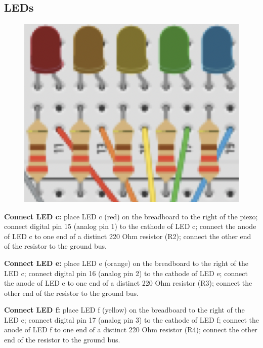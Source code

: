 \documentclass[a4paper]{article}
\begin{document}
\subsection{LEDs}

\begin{figure}
  \vspace{-35pt}
  \begin{center}
    \includegraphics[width=1.1\linewidth]{leds.png}
  \end{center}
\vspace{-25pt}
\end{figure}

\noindent \textbf{Connect LED c:} place LED c (red) on the breadboard to the right of the piezo; connect digital pin 15 (analog pin 1) to the cathode of LED c; connect the anode of LED c to one end of a distinct 220 Ohm resistor (R2); connect the other end of the resistor to the ground bus.

\noindent \textbf{Connect LED e:} place LED e (orange) on the breadboard to the right of the LED c; connect digital pin 16 (analog pin 2) to the cathode of LED e; connect the anode of LED e to one end of a distinct 220 Ohm resistor (R3); connect the other end of the resistor to the ground bus.

\noindent \textbf{Connect LED f:} place LED f (yellow) on the breadboard to the right of the LED e; connect digital pin 17 (analog pin 3) to the cathode of LED f; connect the anode of LED f to one end of a distinct 220 Ohm resistor (R4); connect the other end of the resistor to the ground bus.
\end{document}
